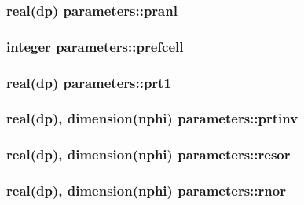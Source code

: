 \hypertarget{classparameters_ac13d28fd9f8fcb734440292e8cb822f3}{
\subsubsection[{pranl}]{\setlength{\rightskip}{0pt plus 5cm}real(dp) parameters\-::pranl}}\label{classparameters_ac13d28fd9f8fcb734440292e8cb822f3}
\hypertarget{classparameters_a7ec8b3b9060f6ad89851c62bf569b526}{
\subsubsection[{prefcell}]{\setlength{\rightskip}{0pt plus 5cm}integer parameters\-::prefcell}}\label{classparameters_a7ec8b3b9060f6ad89851c62bf569b526}
\hypertarget{classparameters_abe40f00e086c94a111f5dadda7649d5c}{
\subsubsection[{prt1}]{\setlength{\rightskip}{0pt plus 5cm}real(dp) parameters\-::prt1}}\label{classparameters_abe40f00e086c94a111f5dadda7649d5c}
\hypertarget{classparameters_a8d12835ff66703e6ea56a39f4a76f06b}{
\subsubsection[{prtinv}]{\setlength{\rightskip}{0pt plus 5cm}real(dp), dimension({\bf nphi}) parameters\-::prtinv}}\label{classparameters_a8d12835ff66703e6ea56a39f4a76f06b}
\hypertarget{classparameters_a4b13bd459ea18434fa50e52b24772415}{
\subsubsection[{resor}]{\setlength{\rightskip}{0pt plus 5cm}real(dp), dimension({\bf nphi}) parameters\-::resor}}\label{classparameters_a4b13bd459ea18434fa50e52b24772415}
\hypertarget{classparameters_abde34e3fc70d97db8c2374968ea53a9c}{
\subsubsection[{rnor}]{\setlength{\rightskip}{0pt plus 5cm}real(dp), dimension({\bf nphi}) parameters\-::rnor}}\label{classparameters_abde34e3fc70d97db8c2374968ea53a9c}

